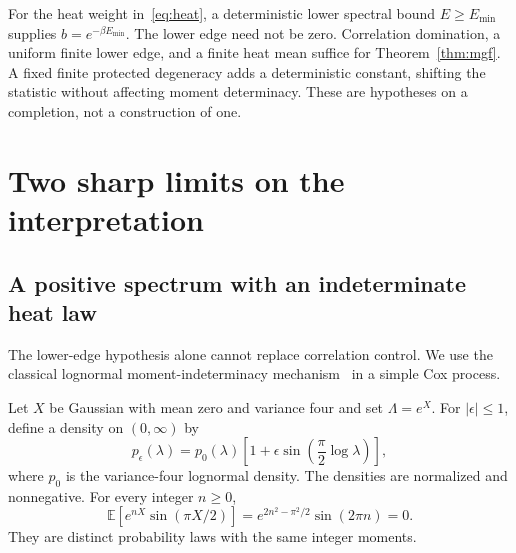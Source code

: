 \documentclass[11pt,a4paper]{article}
\theoremstyle{remark}\newtheorem{remark}[theorem]{Remark}
\newcommand{\E}{\mathbb E}
\begin{document}
For the heat weight in~\eqref{eq:heat}, a deterministic lower spectral bound $E\ge E_{\min}$ supplies $b=e^{-\beta E_{\min}}$.
The lower edge need not be zero.
Correlation domination, a uniform finite lower edge, and a finite heat mean suffice for Theorem~\ref{thm:mgf}.
A fixed finite protected degeneracy adds a deterministic constant, shifting the statistic without affecting moment determinacy.
These are hypotheses on a completion, not a construction of one.

\section{Two sharp limits on the interpretation}\label{sec:counter}
\subsection{A positive spectrum with an indeterminate heat law}
The lower-edge hypothesis alone cannot replace correlation control.
We use the classical lognormal moment-indeterminacy mechanism~\citep{Heyde1963} in a simple Cox process.

Let $X$ be Gaussian with mean zero and variance four and set $\Lambda=e^X$.
For $|\epsilon|\le1$, define a density on $(0,\infty)$ by
\begin{equation}\label{eq:stieltjes}
 p_\epsilon(\lambda)=p_0(\lambda)
 \left[1+\epsilon\sin\left(\frac\pi2\log\lambda\right)\right],
\end{equation}
where $p_0$ is the variance-four lognormal density.
The densities are normalized and nonnegative.
For every integer $n\ge0$,
\begin{equation}\label{eq:sinmom}
 \E[e^{nX}\sin(\pi X/2)]
 =e^{2n^2-\pi^2/2}\sin(2\pi n)=0.
\end{equation}
They are distinct probability laws with the same integer moments.
\end{document}
